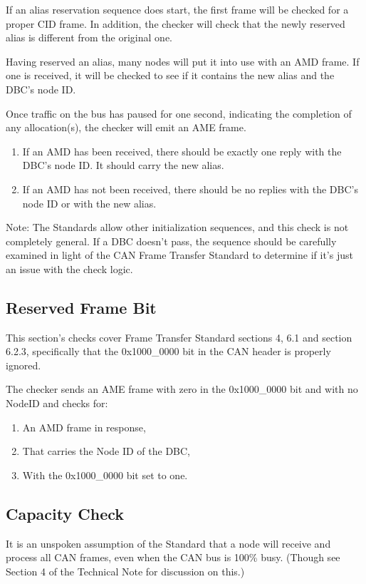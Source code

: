 If an alias reservation sequence does start, 
the first frame will be checked for a proper CID frame.  
In addition, the checker will check that the 
newly reserved alias is different from the original one.

Having reserved an alias, many nodes will put it into use with an AMD frame. 
If one is received, it will be checked to see if it contains the new alias
and the DBC's node ID.

Once traffic on the bus has paused for one second, indicating the completion of 
any allocation(s), the checker will emit an AME frame.
\begin{enumerate}
\item If an AMD has been received, there should be exactly one
        reply with the DBC's node ID.  It should carry the new alias.
\item If an AMD has not been received, there should be no 
        replies with the DBC's node ID or with the new alias.
\end{enumerate}

Note: The Standards allow other initialization sequences, and this check
is not completely general.  If a DBC doesn't pass, the sequence should
be carefully examined in light of the CAN Frame Transfer Standard
to determine if it's just an issue with the check logic.

\subsection{Reserved Frame Bit}

This section's checks cover Frame Transfer Standard sections 4, 6.1 and section 6.2.3, 
specifically that the 0x1000\_0000 bit in the CAN header is properly
ignored.

The checker sends an AME frame with zero in the 0x1000\_0000 bit
and with no NodeID and checks for:
\begin{enumerate}
\item An AMD frame in response,
\item That carries the Node ID of the DBC,
\item With the 0x1000\_0000 bit set to one.
\end{enumerate}

\subsection{Capacity Check}

It is an unspoken assumption of the Standard that a node will receive and
process all CAN frames, even when the CAN bus is 100\% busy. (Though see Section 4
of the Technical Note for discussion on this.) 

